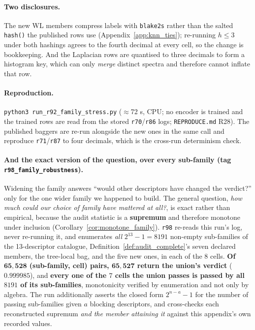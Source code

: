 \paragraph{Two disclosures.} The new WL members compress labels with \texttt{blake2s} rather than the salted \texttt{hash()} the published rows use (Appendix~\ref{app:knn_ties}); re-running $h{\leq}3$ under both hashings agrees to the fourth decimal at every cell, so the change is bookkeeping. And the Laplacian rows are quantised to three decimals to form a histogram key, which can only \emph{merge} distinct spectra and therefore cannot inflate that row.

\paragraph{Reproduction.} \texttt{python3 run\_r92\_family\_stress.py} ($\approx$72 s, CPU; no encoder is trained and the trained rows are read from the stored \texttt{r70}/\texttt{r86} logs; \texttt{REPRODUCE.md} R28). The published baggers are re-run alongside the new ones in the same call and reproduce \texttt{r71}/\texttt{r87} to four decimals, which is the cross-run determinism check.


\paragraph{And the exact version of the question, over every sub-family (tag \texttt{r98\_family\_robustness}).} Widening the family answers ``would other descriptors have changed the verdict?'' only for the one wider family we happened to build. The general question, \emph{how much could our choice of family have mattered at all?}, is exact rather than empirical, because the audit statistic is a \textbf{supremum} and therefore monotone under inclusion (Corollary~\ref{cor:monotone_family}). \texttt{r98} re-reads this run's log, never re-running it, and enumerates \emph{all} $2^{13}-1 = 8191$ non-empty sub-families of the 13-descriptor catalogue, Definition~\ref{def:audit_complete}'s seven declared members, the tree-local bag, and the five new ones, in each of the $8$ cells. \textbf{Of $\mathbf{65{,}528}$ (sub-family, cell) pairs, $\mathbf{65{,}527}$ return the union's verdict} ($0.999985$), and \textbf{every one of the $7$ cells the union passes is passed by all $8191$ of its sub-families}, monotonicity verified by enumeration and not only by algebra. The run additionally asserts the closed form $2^{n-a}-1$ for the number of passing sub-families given $a$ blocking descriptors, and cross-checks each reconstructed supremum \emph{and the member attaining it} against this appendix's own recorded values.

